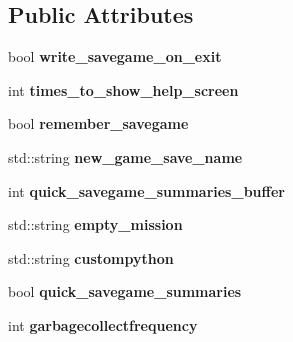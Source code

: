 \subsection*{Public Attributes}
\begin{DoxyCompactItemize}
\item 
bool {\bfseries write\+\_\+savegame\+\_\+on\+\_\+exit}\hypertarget{classvs__options_a174861d05f1caf43a505db0e4fe033e2}{}\label{classvs__options_a174861d05f1caf43a505db0e4fe033e2}

\item 
int {\bfseries times\+\_\+to\+\_\+show\+\_\+help\+\_\+screen}\hypertarget{classvs__options_aeaaf631c03072ca3fa77c0a451037092}{}\label{classvs__options_aeaaf631c03072ca3fa77c0a451037092}

\item 
bool {\bfseries remember\+\_\+savegame}\hypertarget{classvs__options_a896cc364704e2154df88534758fcab5f}{}\label{classvs__options_a896cc364704e2154df88534758fcab5f}

\item 
std\+::string {\bfseries new\+\_\+game\+\_\+save\+\_\+name}\hypertarget{classvs__options_adb6b77dcab2111fceca859f18a5d455e}{}\label{classvs__options_adb6b77dcab2111fceca859f18a5d455e}

\item 
int {\bfseries quick\+\_\+savegame\+\_\+summaries\+\_\+buffer}\hypertarget{classvs__options_a8286084705479ad2e040f6b1de1fcec1}{}\label{classvs__options_a8286084705479ad2e040f6b1de1fcec1}

\item 
std\+::string {\bfseries empty\+\_\+mission}\hypertarget{classvs__options_aa71ecf520b2ec62a8647553f9f85333a}{}\label{classvs__options_aa71ecf520b2ec62a8647553f9f85333a}

\item 
std\+::string {\bfseries custompython}\hypertarget{classvs__options_a6742dc178471ac1ae4df341338b09fac}{}\label{classvs__options_a6742dc178471ac1ae4df341338b09fac}

\item 
bool {\bfseries quick\+\_\+savegame\+\_\+summaries}\hypertarget{classvs__options_a7dd1ee4e49eaece2edf40118c9028284}{}\label{classvs__options_a7dd1ee4e49eaece2edf40118c9028284}

\item 
int {\bfseries garbagecollectfrequency}\hypertarget{classvs__options_a7fe7f70d0d118a6b282f0551577691b9}{}\label{classvs__options_a7fe7f70d0d118a6b282f0551577691b9}


\end{DoxyCompactItemize}

